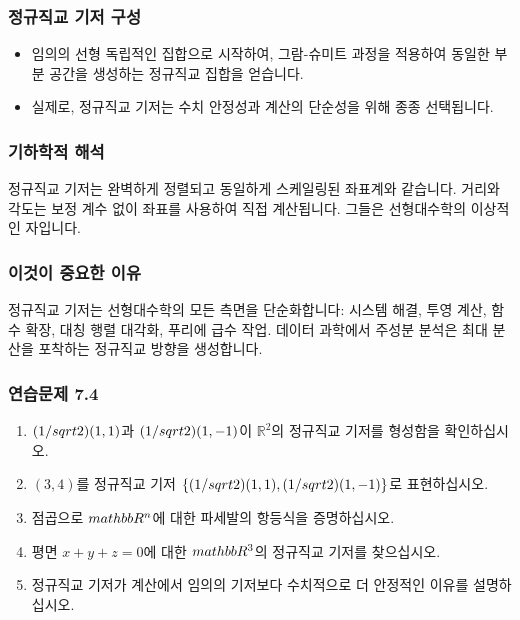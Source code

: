 \documentclass[
  12pt,
  a4paper,
]{article}
\begin{document}
\subsubsection{정규직교 기저 구성}\label{constructing-orthonormal-bases}

\begin{itemize}
\item
  임의의 선형 독립적인 집합으로 시작하여, 그람-슈미트 과정을 적용하여 동일한 부분 공간을 생성하는 정규직교 집합을 얻습니다.
\item
  실제로, 정규직교 기저는 수치 안정성과 계산의 단순성을 위해 종종 선택됩니다.
\end{itemize}

\subsubsection{기하학적 해석}\label{geometric-interpretation-16}

정규직교 기저는 완벽하게 정렬되고 동일하게 스케일링된 좌표계와 같습니다. 거리와 각도는 보정 계수 없이 좌표를 사용하여 직접 계산됩니다. 그들은 선형대수학의 이상적인 자입니다.

\subsubsection{이것이 중요한 이유}\label{why-this-matters-27}

정규직교 기저는 선형대수학의 모든 측면을 단순화합니다: 시스템 해결, 투영 계산, 함수 확장, 대칭 행렬 대각화, 푸리에 급수 작업. 데이터 과학에서 주성분 분석은 최대 분산을 포착하는 정규직교 방향을 생성합니다.

\subsubsection{연습문제 7.4}\label{exercises-74}

\begin{enumerate}
\def\labelenumi{\arabic{enumi}.}
\item
  \((1/\\sqrt{2})(1,1)\)과 \((1/\\sqrt{2})(1,-1)\)이 \(\mathbb{R}^2\)의 정규직교 기저를 형성함을 확인하십시오.
\item
  \((3,4)\)를 정규직교 기저 \(\{(1/\\sqrt{2})(1,1), (1/\\sqrt{2})(1,-1)\}\)로 표현하십시오.
\item
  점곱으로 \(\\mathbb{R}^n\)에 대한 파세발의 항등식을 증명하십시오.
\item
  평면 \(x+y+z=0\)에 대한 \(\\mathbb{R}^3\)의 정규직교 기저를 찾으십시오.
\item
  정규직교 기저가 계산에서 임의의 기저보다 수치적으로 더 안정적인 이유를 설명하십시오.
\end{enumerate}
\end{document}
